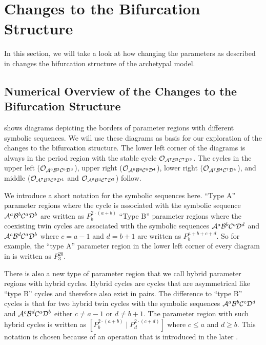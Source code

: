 \section{Changes to the Bifurcation Structure}
\label{sec:add.change}

In this section, we will take a look at how changing the parameters as described in  changes the bifurcation structure of the archetypal model.

\subsection{Numerical Overview of the Changes to the Bifurcation Structure}
\label{sec:add.change.num}

 shows diagrams depicting the borders of parameter regions with different symbolic sequences.
We will use these diagrams as basis for our exploration of the changes to the bifurcation structure.
The lower left corner of the diagrams is always in the period region with the stable cycle $\mathcal{O}_{\mathcal{A}^7\mathcal{B}^3\mathcal{C}^7\mathcal{D}^3}$.
The cycles in the upper left ($\mathcal{O}_{\mathcal{A}^6\mathcal{B}^3\mathcal{C}^6\mathcal{D}^3}$), upper right ($\mathcal{O}_{\mathcal{A}^6\mathcal{B}^4\mathcal{C}^6\mathcal{D}^4}$), lower right ($\mathcal{O}_{\mathcal{A}^7\mathcal{B}^4\mathcal{C}^7\mathcal{D}^4}$), and middle ($\mathcal{O}_{\mathcal{A}^7\mathcal{B}^3\mathcal{C}^6\mathcal{D}^4}$ and $\mathcal{O}_{\mathcal{A}^6\mathcal{B}^4\mathcal{C}^7\mathcal{D}^3}$) follow.

We introduce a short notation for the symbolic sequences here.
``Type A'' parameter regions where the cycle is associated with the symbolic sequence $\mathcal{A}^a\mathcal{B}^b\mathcal{C}^a\mathcal{D}^b$ are written as $P^{2 \cdot \left(a + b\right)}_b$
``Type B'' parameter regions where the coexisting twin cycles are associated with the symbolic sequences $\mathcal{A}^a\mathcal{B}^b\mathcal{C}^c\mathcal{D}^d$ and $\mathcal{A}^c\mathcal{B}^d\mathcal{C}^a\mathcal{D}^b$ where $c = a - 1$ and $d = b + 1$ are written as $P^{a + b + c + d}_b$.
So for example, the ``type A'' parameter region in the lower left corner of every diagram in  is written as $P^{20}_3$.

There is also a new type of parameter region that we call hybrid parameter regions with hybrid cycles.
Hybrid cycles are cycles that are asymmetrical like ``type B'' cycles and therefore also exist in pairs.
The difference to ``type B'' cycles is that for two hybrid twin cycles with the symbolic sequences $\mathcal{A}^a\mathcal{B}^b\mathcal{C}^c\mathcal{D}^d$ and $\mathcal{A}^c\mathcal{B}^d\mathcal{C}^a\mathcal{D}^b$ either $c \neq a - 1$ or $d \neq b + 1$.
The parameter region with such hybrid cycles is written as $\left[P^{2 \cdot \left(a + b\right)}_b \mid P^{2 \cdot \left(c + d\right)}_d\right]$ where $c \leq a$ and $d \geq b$.
This notation is chosen because of an operation that is introduced in the later .


